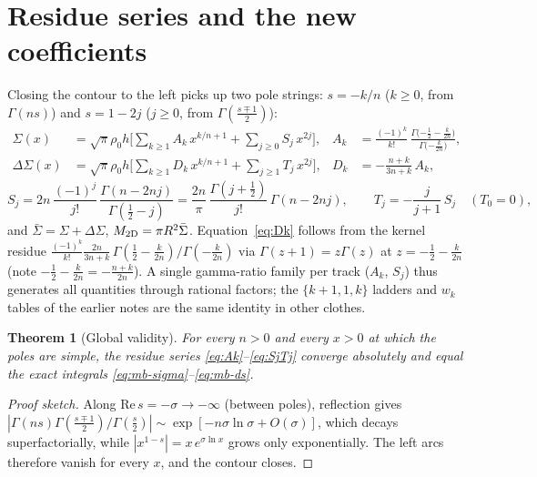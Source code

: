 \documentclass{article}
\newtheorem{theorem}{Theorem}
\begin{document}
\section{Residue series and the new coefficients}\label{sec:coeffs}

Closing the contour to the left picks up two pole strings: $s=-k/n$
($k\ge0$, from $\Gamma(ns)$) and $s=1-2j$ ($j\ge0$, from
$\Gamma(\tfrac{s\mp1}{2})$):
\begin{align}
\Sigma(x) &= \sqrt\pi \rho_0 h \Big[ \sum_{k\ge1} A_k\,x^{k/n+1}
 + \sum_{j\ge0} S_j\,x^{2j} \Big], &
A_k &= \frac{(-1)^k}{k!}\,
\frac{\Gamma\!\big({-\tfrac12}-\tfrac{k}{2n}\big)}
     {\Gamma\!\big({-\tfrac{k}{2n}}\big)},
\label{eq:Ak}\\
\Delta\Sigma(x) &= \sqrt\pi \rho_0 h \Big[ \sum_{k\ge1} D_k\,x^{k/n+1}
 + \sum_{j\ge1} T_j\,x^{2j} \Big], &
D_k &= -\frac{n+k}{3n+k}\,A_k,
\label{eq:Dk}
\end{align}
\begin{equation}\label{eq:SjTj}
S_j = 2n\,\frac{(-1)^j}{j!}\,
\frac{\Gamma(n-2nj)}{\Gamma(\tfrac12-j)}
= \frac{2n}{\pi}\,\frac{\Gamma(j+\tfrac12)}{j!}\,\Gamma(n-2nj),
\qquad
T_j = -\frac{j}{j+1}\,S_j \quad (T_0=0),
\end{equation}
and $\bar\Sigma = \Sigma + \Delta\Sigma$, $M_{\rm 2D} = \pi R^2\bar\Sigma$.
Equation~\eqref{eq:Dk} follows from the kernel residue
$\frac{(-1)^k}{k!}\frac{2n}{3n+k}\,
\Gamma(\tfrac12-\tfrac{k}{2n})/\Gamma(-\tfrac{k}{2n})$ via
$\Gamma(z+1)=z\Gamma(z)$ at $z=-\tfrac12-\tfrac{k}{2n}$ (note
$-\tfrac12-\tfrac{k}{2n} = -\tfrac{n+k}{2n}$). A single gamma-ratio family
per track ($A_k$, $S_j$) thus generates all quantities through rational
factors; the $\{k+1,1,k\}$ ladders and $w_k$ tables of the earlier notes
are the same identity in other clothes.

\begin{theorem}[Global validity]\label{thm:valid}
For every $n>0$ and every $x>0$ at which the poles are simple, the residue
series \eqref{eq:Ak}--\eqref{eq:SjTj} converge absolutely and equal the
exact integrals \eqref{eq:mb-sigma}--\eqref{eq:mb-ds}.
\end{theorem}

\begin{proof}[Proof sketch]
Along $\mathrm{Re}\,s=-\sigma\to-\infty$ (between poles), reflection gives
$|\Gamma(ns)\Gamma(\tfrac{s\mp1}{2})/\Gamma(\tfrac s2)| \sim
\exp[-n\sigma\ln\sigma + O(\sigma)]$, which decays superfactorially, while
$|x^{1-s}| = x\,e^{\sigma\ln x}$ grows only exponentially. The left arcs
therefore vanish for every $x$, and the contour closes.
\end{proof}
\end{document}
